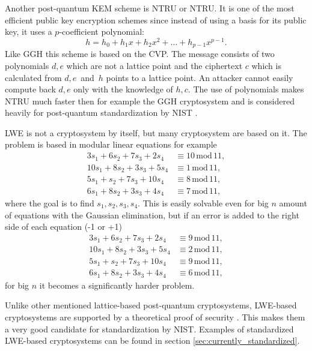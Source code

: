 Another post-quantum KEM scheme is NTRU or \acl{NTRU}. It is one of the most efficient public key encryption schemes since instead of using a basis for  its public key, it uses a $p$-coefficient polynomial:
\begin{equation}
  h=h_0+h_1x+h_2x^2+\dots+h_{p-1}x^{p-1}.
\end{equation}
Like GGH this scheme is based on the CVP. The message consists of two polynomials $d, e$ which are not a lattice point and the ciphertext $c$ which is calculated from $d, e$~and~$h$ points to a lattice point. An attacker cannot easily compute back $d, e$ only with the knowledge of $h, c$. The use of polynomials makes NTRU much faster then for example the GGH cryptosystem and is considered heavily for post-quantum standardization by NIST \cite{Bernstein149}.

LWE is not a cryptosystem by itself, but many cryptosystem are based on it. The problem is based in modular linear equations for example
\begin{align}
  3s_1+6s_2+7s_3+2s_4&\equiv 10\,\mathrm{mod}\,11,\\
  10s_1+8s_2+3s_3+5s_4&\equiv 1\,\mathrm{mod}\,11,\\
  5s_1+s_2+7s_3+10s_4&\equiv 8\,\mathrm{mod}\,11,\\
  6s_1+8s_2+3s_3+4s_4&\equiv 7\,\mathrm{mod}\,11,
\end{align}
where the goal is to find $s_1, s_2, s_3, s_4$. This is easily solvable even for big $n$ amount of equations with the Gaussian elimination, but if an error is added to the right side of each equation (-1 or +1)
\begin{align}
  3s_1+6s_2+7s_3+2s_4&\equiv 9\,\mathrm{mod}\,11,\\
  10s_1+8s_2+3s_3+5s_4&\equiv 2\,\mathrm{mod}\,11,\\
  5s_1+s_2+7s_3+10s_4&\equiv 9\,\mathrm{mod}\,11,\\
  6s_1+8s_2+3s_3+4s_4&\equiv 6\,\mathrm{mod}\,11,
\end{align}
for big $n$ it becomes a significantly harder problem. \cite{Regev2005}

Unlike other mentioned lattice-based post-quantum cryptosystems, LWE-based cryptosystems are supported by a theoretical proof of security \cite{Bernstein2009}. This makes them a very good candidate for standardization by NIST. Examples of standardized LWE-based cryptosystems can be found in section \ref{sec:currently_standardized}.